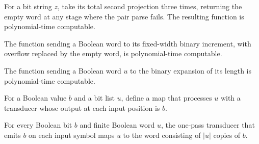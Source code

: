 \begin{theorem}
\label{Complexity.Meyer.pt_vp}
\leanok
{}
For a bit string $z$, take its total second projection three times, returning the empty
word at any stage where the pair parse fails. The resulting function is polynomial-time
computable.
\end{theorem}

\begin{theorem}
\label{Complexity.Meyer.pt_inc}
\leanok
{}
The function sending a Boolean word to its fixed-width binary increment, with overflow
replaced by the empty word, is polynomial-time computable.
\end{theorem}

\begin{theorem}
\label{Complexity.Meyer.pt_lengthBits}
\leanok
{}
The function sending a Boolean word $u$ to the binary expansion of its length is
polynomial-time computable.
\end{theorem}

\begin{definition}
\label{Complexity.Meyer.constMap}
\leanok
{}
For a Boolean value $b$ and a bit list $u$, define a map that processes $u$ with a
transducer whose output at each input position is $b$.
\end{definition}

\begin{theorem}
\label{Complexity.Meyer.constMap_eq}
\leanok
{}
For every Boolean bit $b$ and finite Boolean word $u$, the one-pass transducer that
emits $b$ on each input symbol maps $u$ to the word consisting of $|u|$ copies of $b$.
\end{theorem}

